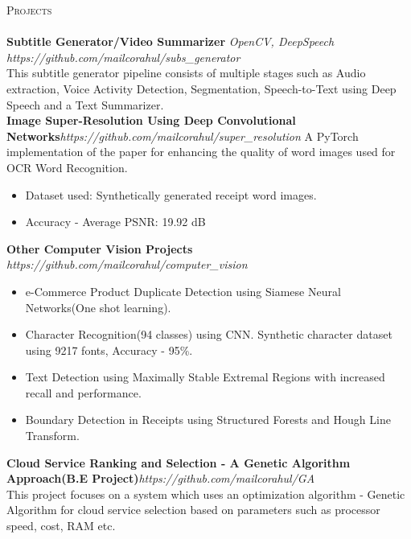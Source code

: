 \documentclass[a4paper]{article}
\newcommand{\lineunder} {
    \vspace*{-8pt} \\
    \hspace*{-18pt} \hrulefill \\
}
\newcommand{\header} [1] {
    {\hspace*{-18pt}\vspace*{6pt} \textsc{#1}}
    \vspace*{-6pt} \lineunder
}
\begin{document}
\header{Projects}
{\textbf{Subtitle Generator/Video Summarizer}} {\sl OpenCV, DeepSpeech} \hfill \textit{https://github.com/mailcorahul/subs\_generator}\\
This subtitle generator pipeline consists of multiple stages such as Audio extraction, Voice Activity Detection, Segmentation, Speech-to-Text using Deep Speech and a Text Summarizer.\\
\vspace*{2mm}
{\textbf{Image Super-Resolution Using Deep Convolutional Networks}}\hfill \textit{https://github.com/mailcorahul/super\_resolution}
A PyTorch implementation of the paper for enhancing the quality of word images used for OCR Word Recognition.\\
    \begin{itemize}
        \itemsep-0.5em
        \item Dataset used: Synthetically generated receipt word images.
        \item Accuracy - Average PSNR: 19.92 dB
    \end{itemize}

\vspace*{2mm}
{\textbf{Other Computer Vision Projects}} \\ \textit{https://github.com/mailcorahul/computer\_vision}
    \begin{itemize}
        \itemsep-0.5em
        \item e-Commerce Product Duplicate Detection using Siamese Neural Networks(One shot learning).
        \item Character Recognition(94 classes) using CNN. Synthetic character dataset using 9217 fonts, Accuracy - 95\%.
        \item Text Detection using Maximally Stable Extremal Regions with increased recall and performance.
        \item Boundary Detection in Receipts using Structured Forests and Hough Line Transform.\\
    \end{itemize}
\vspace*{2mm}
{\textbf{Cloud Service Ranking and Selection - A Genetic Algorithm Approach(B.E Project)}}\hfill \textit{https://github.com/mailcorahul/GA}\\
This project focuses on a system which uses an optimization algorithm - Genetic Algorithm for cloud service selection based on parameters such as processor speed, cost, RAM etc.\\
\vspace*{2mm}
\end{document}
